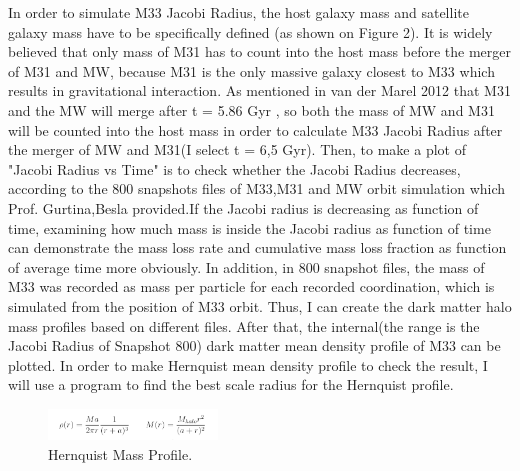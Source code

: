 \documentclass[twocolumn]{aastex63}
\begin{document}
\indent In order to simulate M33 Jacobi Radius, the host galaxy mass and satellite galaxy mass have to be specifically defined (as shown on Figure 2). It is widely believed that only mass of M31 has to count into the host mass before the merger of M31 and MW, because M31 is the only massive galaxy closest to M33 which results in gravitational interaction. As mentioned in van der Marel 2012 that M31 and the MW will merge after t = 5.86 Gyr \citep{marel12}, so both the mass of MW and M31 will be counted into the host mass in order to calculate M33 Jacobi Radius after the merger of MW and M31(I select t = 6,5 Gyr). Then, to make a plot of "Jacobi Radius vs Time" is to check whether the Jacobi Radius decreases, according to the 800 snapshots files of M33,M31 and MW orbit simulation which Prof. Gurtina,Besla provided.If the Jacobi radius is decreasing as function of time, examining how much mass is inside the Jacobi radius as function of time can demonstrate the mass loss rate and cumulative mass loss fraction as function of average time more obviously. In addition, in 800 snapshot files, the mass of M33 was recorded as mass per particle for each recorded coordination, which is simulated from the position of M33 orbit. Thus, I can create the dark matter halo mass profiles based on different files. After that, the internal(the range is the Jacobi Radius of Snapshot 800) dark matter mean density profile of M33 can be plotted. In order to make Hernquist mean density profile to check the result, I will use a program to find the best scale radius for the Hernquist profile. \\
\begin{figure}[H]
    \centering
    \includegraphics[width=4.5cm]{Hernquist Equation.png}
    \caption{Hernquist Mass Profile\cite{Hernquist}.}
    \label{Hernquistfigure}
\end{figure}
\end{document}
